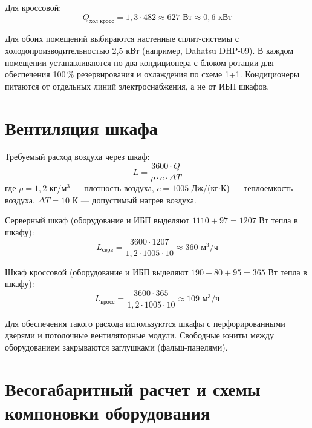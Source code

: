 \documentclass{bmstu}
\begin{document}
Для кроссовой:
\begin{equation}
    Q_{\text{хол\_кросс}} = 1{,}3 \cdot 482 \approx 627 \text{ Вт} \approx 0{,}6 \text{ кВт}
\end{equation}

Для обоих помещений выбираются настенные сплит-системы с холодопроизводительностью 2,5 кВт (например, Dahatsu DHP-09). В каждом помещении устанавливаются по два кондиционера с блоком ротации для обеспечения 100\,\% резервирования и охлаждения по схеме 1+1. Кондиционеры питаются от отдельных линий электроснабжения, а не от ИБП шкафов.

\section{Вентиляция шкафа}

Требуемый расход воздуха через шкаф:
\begin{equation}
    L = \frac{3600 \cdot Q}{\rho \cdot c \cdot \Delta T}
\end{equation}
где $\rho = 1{,}2$ кг/м$^3$ — плотность воздуха, $c = 1005$ Дж/(кг$\cdot$К) — теплоемкость воздуха, $\Delta T = 10$ К — допустимый нагрев воздуха.

Серверный шкаф (оборудование и ИБП выделяют $1110 + 97 = 1207$ Вт тепла в шкафу):
\begin{equation}
    L_{\text{серв}} = \frac{3600 \cdot 1207}{1{,}2 \cdot 1005 \cdot 10} \approx 360 \text{ м}^3/\text{ч}
\end{equation}

Шкаф кроссовой (оборудование и ИБП выделяют $190 + 80 + 95 = 365$ Вт тепла в шкафу):
\begin{equation}
    L_{\text{кросс}} = \frac{3600 \cdot 365}{1{,}2 \cdot 1005 \cdot 10} \approx 109 \text{ м}^3/\text{ч}
\end{equation}

Для обеспечения такого расхода используются шкафы с перфорированными дверями и потолочные вентиляторные модули. Свободные юниты между оборудованием закрываются заглушками (фальш-панелями).

\section{Весогабаритный расчет и схемы компоновки оборудования}
\end{document}
